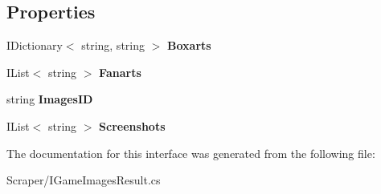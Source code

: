 \subsection*{Properties}
\begin{DoxyCompactItemize}
\item 
\hypertarget{interface_snowflake_1_1_scraper_1_1_i_game_images_result_a43e549bdb8262de9312dbbec70cffe7b}{}I\+Dictionary$<$ string, string $>$ {\bfseries Boxarts}\label{interface_snowflake_1_1_scraper_1_1_i_game_images_result_a43e549bdb8262de9312dbbec70cffe7b}

\item 
\hypertarget{interface_snowflake_1_1_scraper_1_1_i_game_images_result_a1e72093bed4ba6e5649032e048d6a4ee}{}I\+List$<$ string $>$ {\bfseries Fanarts}\label{interface_snowflake_1_1_scraper_1_1_i_game_images_result_a1e72093bed4ba6e5649032e048d6a4ee}

\item 
\hypertarget{interface_snowflake_1_1_scraper_1_1_i_game_images_result_a3a2c0cb208cd30a431a8493cc7589cb1}{}string {\bfseries Images\+I\+D}\label{interface_snowflake_1_1_scraper_1_1_i_game_images_result_a3a2c0cb208cd30a431a8493cc7589cb1}

\item 
\hypertarget{interface_snowflake_1_1_scraper_1_1_i_game_images_result_adab7285230c4c88d2a38dbd0d4921085}{}I\+List$<$ string $>$ {\bfseries Screenshots}\label{interface_snowflake_1_1_scraper_1_1_i_game_images_result_adab7285230c4c88d2a38dbd0d4921085}

\end{DoxyCompactItemize}


The documentation for this interface was generated from the following file\+:\begin{DoxyCompactItemize}
\item 
Scraper/I\+Game\+Images\+Result.\+cs\end{DoxyCompactItemize}
